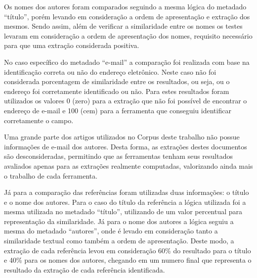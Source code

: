 Os nomes dos autores foram comparados seguindo a mesma lógica do metadado ``título'', porém levando em consideração a ordem de apresentação e extração dos mesmos. Sendo assim, além de verificar a similaridade entre os nomes os testes levaram em consideração a ordem de apresentação dos nomes, requisito necessário para que uma extração considerada positiva.


No caso específico do metadado ``e-mail'' a comparação foi realizada com base na identificação correta ou não do endereço eletrônico. Neste caso não foi considerada porcentagem de similaridade entre os resultados, ou seja, ou o endereço foi corretamente identificado ou não. Para estes resultados foram utilizados os valores 0 (zero) para a extração que não foi possível de encontrar o endereço de e-mail e 100 (cem) para a ferramenta que conseguiu identificar corretamente o campo.


Uma grande parte dos artigos utilizados no Corpus deste trabalho não possue informações de e-mail dos autores. Desta forma, as extrações destes documentos são desconsideradas, permitindo que as ferramentas tenham seus resultados avaliados apenas para as extrações realmente computadas, valorizando ainda mais o trabalho de cada ferramenta.


Já para a comparação das referências foram utilizadas duas informações: o título e o nome dos autores. Para o caso do título da referência a lógica utilizada foi a mesma utilizada no metadado ``título'', utilizando de um valor percentual para representação da similaridade. Já para o nome dos autores a lógica seguiu a mesma do metadado ``autores'', onde é levado em consideração tanto a similaridade textual como também a ordem de apresentação. Deste modo, a extração de cada referência levou em consideração 60\% do resultado para o título e 40\% para os nomes dos autores, chegando em um numero final que representa o resultado da extração de cada referência identificada.


